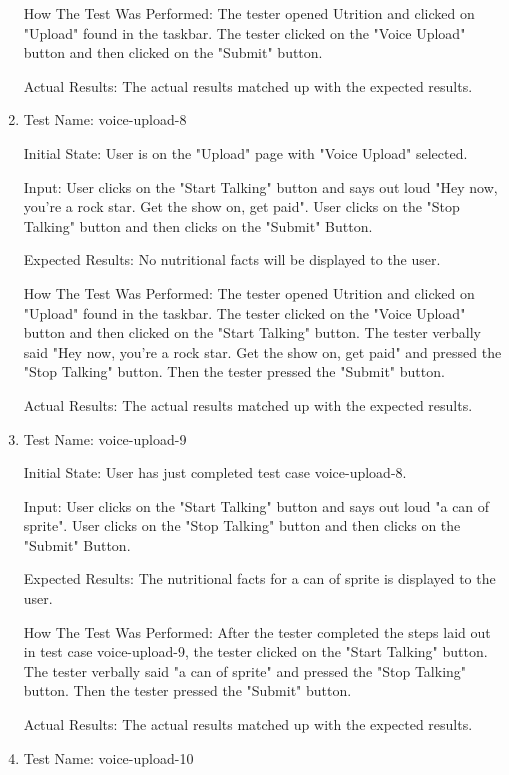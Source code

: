 \documentclass[12pt, titlepage]{article}
\begin{document}
\begin{enumerate}
		How The Test Was Performed: The tester opened Utrition and clicked on "Upload" found in the taskbar. The tester clicked on the "Voice Upload" button and then clicked on the "Submit" button.
		
		Actual Results: The actual results matched up with the expected results.
		
		\item{Test Name: voice-upload-8}
		
		Initial State: User is on the "Upload" page with "Voice Upload" selected.
		
		Input: User clicks on the "Start Talking" button and says out loud "Hey now, you're a rock star. Get the show on, get paid". User clicks on the "Stop Talking" button and then clicks on the "Submit" Button.
		
		Expected Results: No nutritional facts will be displayed to the user.
		
		How The Test Was Performed: The tester opened Utrition and clicked on "Upload" found in the taskbar. The tester clicked on the "Voice Upload" button and then clicked on the "Start Talking" button. The tester verbally said "Hey now, you're a rock star. Get the show on, get paid" and pressed the "Stop Talking" button. Then the tester pressed the "Submit" button.
		
		Actual Results: The actual results matched up with the expected results.
		
		\item{Test Name: voice-upload-9}
		
		Initial State: User has just completed test case voice-upload-8.
		
		Input: User clicks on the "Start Talking" button and says out loud "a can of sprite". User clicks on the "Stop Talking" button and then clicks on the "Submit" Button.
		
		Expected Results: The nutritional facts for a can of sprite is displayed to the user.
		
		How The Test Was Performed: After the tester completed the steps laid out in test case voice-upload-9, the tester clicked on the "Start Talking" button. The tester verbally said "a can of sprite" and pressed the "Stop Talking" button. Then the tester pressed the "Submit" button.
		
		Actual Results: The actual results matched up with the expected results.
		
		\item{Test Name: voice-upload-10}
		

\end{enumerate}
\end{document}
